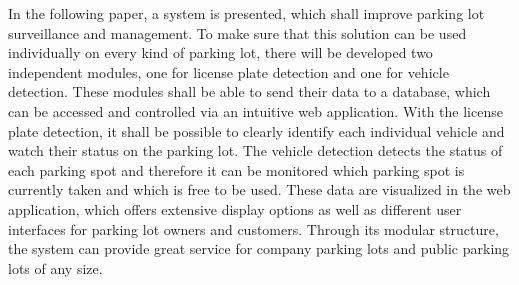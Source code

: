 In the following paper, a system is presented, which shall improve parking lot surveillance and management. To make 
sure that this solution can be used individually on every kind of parking lot, there will be developed two independent modules, 
one for license plate detection and one for vehicle detection. These modules shall be able to send their data to a database, 
which can be accessed and controlled via an intuitive web application. With the license plate detection, it shall be possible 
to clearly identify each individual vehicle and watch their status on the parking lot. The vehicle detection detects the status 
of each parking spot and therefore it can be monitored which parking spot is currently taken and which is free to be used. These 
data are visualized in the web application, which offers extensive display options as well as different user interfaces for parking 
lot owners and customers. Through its modular structure, the system can provide great service for company parking lots and public parking lots of any size.